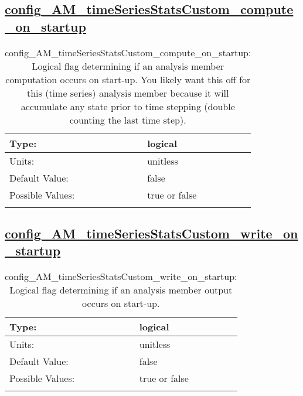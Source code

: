 \subsection[config\_AM\_timeSeriesStatsCustom\_compute\_on\_startup]{\hyperref[sec:nm_tab_AM_timeSeriesStatsCustom]{config\_AM\_timeSeriesStatsCustom\_compute\_on\_startup}}
\label{subsec:nm_sec_config_AM_timeSeriesStatsCustom_compute_on_startup}
\begin{center}
\begin{longtable}{| p{2.0in} || p{4.0in} |}
    \hline
    Type: & logical \\
    \hline
    Units: & \si{unitless} \\
    \hline
    Default Value: & false \\
    \hline
    Possible Values: & true or false \\
    \hline
    \caption{config\_AM\_timeSeriesStatsCustom\_compute\_on\_startup: Logical flag determining if an analysis member computation occurs on start-up. You likely want this off for this (time series) analysis member because it will accumulate any state prior to time stepping (double counting the last time step).}
\end{longtable}
\end{center}
\subsection[config\_AM\_timeSeriesStatsCustom\_write\_on\_startup]{\hyperref[sec:nm_tab_AM_timeSeriesStatsCustom]{config\_AM\_timeSeriesStatsCustom\_write\_on\_startup}}
\label{subsec:nm_sec_config_AM_timeSeriesStatsCustom_write_on_startup}
\begin{center}
\begin{longtable}{| p{2.0in} || p{4.0in} |}
    \hline
    Type: & logical \\
    \hline
    Units: & \si{unitless} \\
    \hline
    Default Value: & false \\
    \hline
    Possible Values: & true or false \\
    \hline
    \caption{config\_AM\_timeSeriesStatsCustom\_write\_on\_startup: Logical flag determining if an analysis member output occurs on start-up.}
\end{longtable}
\end{center}
